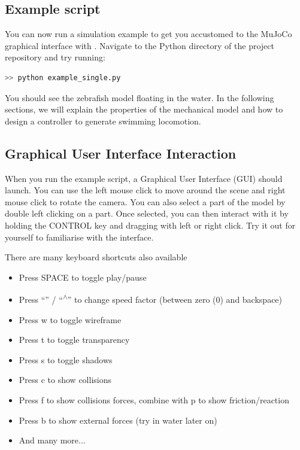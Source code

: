 \documentclass{cmc}
\begin{document}
\subsection*{Example script}
You can now run a simulation example to get you accustomed
to the MuJoCo graphical interface with .
Navigate to the Python directory of the project repository and try running:
\label{sec:first-example}
\begin{lstlisting}[language=Bash]
  >> python example_single.py
\end{lstlisting}

You should see the zebrafish model floating in the water. In the following sections, we will explain the properties of the mechanical model and how to design a controller to generate swimming locomotion.

\subsection*{Graphical User Interface Interaction}
When you run the example script, a Graphical User Interface (GUI) should launch.
You can use the left mouse click to move around the scene and right mouse click
to rotate the camera. You can also select a part of the model by double left
clicking on a part. Once selected, you can then interact with it by holding the
CONTROL key and dragging with left or right click. Try it out for yourself to
familiarise with the interface.

There are many keyboard shortcuts also available

\begin{itemize}
\item Press SPACE to toggle play/pause
\item Press ``\textquotesingle'' / ``\textsuperscript{$\wedge$}'' to change
  speed factor (between zero (0) and backspace)
\item Press w to toggle wireframe
\item Press t to toggle transparency
\item Press s to toggle shadows
\item Press c to show collisions
\item Press f to show collisions forces, combine with p to show
  friction/reaction
\item Press b to show external forces (try in water later on)
\item And many more...
\end{itemize}
\end{document}
